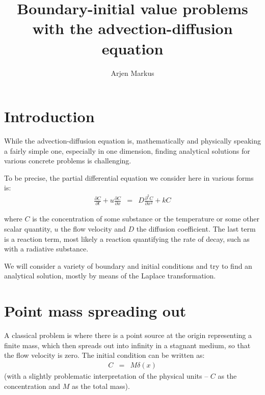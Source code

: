 \documentclass[onecolumn]{article}
\begin{document}
\title{Boundary-initial value problems with the advection-diffusion equation}
\author{Arjen Markus}

\maketitle

\section*{Introduction}
While the advection-diffusion equation is, mathematically and physically
speaking a fairly simple one, especially in one dimension, finding analytical
solutions for various concrete problems is challenging.

To be precise, the partial differential equation we consider here in various forms is:
\begin{eqnarray}
\label{advdiff}
    \frac{\partial C}{\partial t} + u \frac{\partial C}{\partial x} &=& D \frac{\partial^2 C}{\partial x^2} + k C
\end{eqnarray}

\noindent where $C$ is the concentration of some substance or the temperature or some other scalar quantity,
$u$ the flow velocity and $D$ the diffusion coefficient. The last term is a reaction term, most likely a
reaction quantifying the rate of decay, such as with a radiative substance.

We will consider a variety of boundary and initial conditions and try to find an analytical solution, mostly
by means of the Laplace transformation.

\section*{Point mass spreading out}
\label{pointmass}
A classical problem is where there is a point source at the origin representing a finite mass, which then
spreads out into infinity in a stagnant medium, so that the flow velocity is zero. The initial condition
can be written as:
\begin{eqnarray}
\nonumber    C &=& M \delta(x)
\end{eqnarray}
\nonumber (with a slightly problematic interpretation of the physical units -- $C$ as the concentration and $M$ as the total mass).
\end{document}
